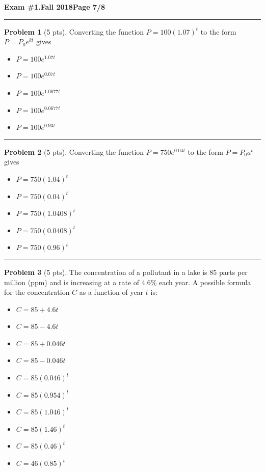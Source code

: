 \documentclass[12pt]{article}
\makeatletter
\theoremstyle{definition}
\newtheorem{problem}{Problem}
\newcommand*{\radiobutton}{%
  \@ifstar{\@radiobutton0}{\@radiobutton1}%
}
\newcommand*{\@radiobutton}[1]{%
  \begin{tikzpicture}
    \pgfmathsetlengthmacro\radius{height("X")/2}
    \draw[radius=\radius] circle;
    \ifcase#1 \fill[radius=.6*\radius] circle;\fi
  \end{tikzpicture}%
}
\makeatother
\begin{document}
\newpage 


\hfill{\large\bf Exam \#1.}\hfill{\large\bf  Fall 2018}\hfill{\large\bf Page 7/8}\hrule

\bigskip
\begin{problem}[5 pts]
  Converting the function $P = 100 (1.07)^t$ to the form $P = P_0e^{kt}$ gives
  \begin{itemize}
  \item[\radiobutton] $P = 100e^{1.07t}$
  \item[\radiobutton] $P = 100 e^{0.07t}$
  \item[\radiobutton] $P = 100 e^{1.0677t}$
  \item[\radiobutton] $P = 100 e^{0.0677t}$
  \item[\radiobutton] $P = 100 e^{0.93t}$
  \end{itemize}
\end{problem}

\hrule

\begin{problem}[5 pts]
  Converting the function $P = 750e^{0.04t}$ to the form $P = P_0a^t$ gives
  \begin{itemize}
  \item[\radiobutton] $P = 750 (1.04)^t$
  \item[\radiobutton] $P = 750 (0.04)^t$
  \item[\radiobutton] $P = 750 (1.0408)^t$
  \item[\radiobutton] $P = 750 (0.0408)^t$
  \item[\radiobutton] $P = 750 (0.96)^t$
  \end{itemize}
\end{problem}
\hrule

\begin{problem}[5 pts]
  The concentration of a pollutant in a lake is 85 parts per million (ppm) and is increasing at a rate of 4.6\% each
  year. A possible formula for the concentration $C$ as a function of year $t$ is: 
  \begin{itemize}
  \item[\radiobutton] $C = 85 + 4.6t$
  \item[\radiobutton] $C = 85 - 4.6t$
  \item[\radiobutton] $C = 85 + 0.046t$
  \item[\radiobutton] $C = 85 - 0.046t$
  \item[\radiobutton] $C = 85(0.046)^t$
  \item[\radiobutton] $C = 85(0.954)^t$
  \item[\radiobutton] $C = 85(1.046)^t$
  \item[\radiobutton] $C = 85(1.46)^t$
  \item[\radiobutton] $C = 85(0.46)^t$
  \item[\radiobutton] $C = 46(0.85)^t$
  \end{itemize}
\end{problem}
\newpage
\end{document}
